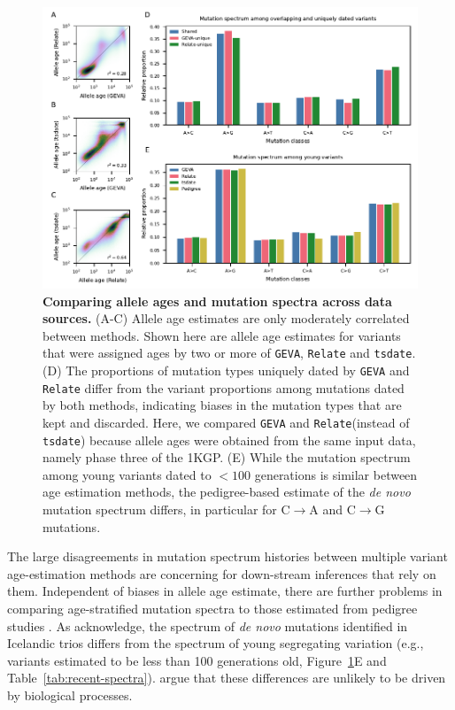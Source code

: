 \documentclass[]{article}
\newcommand{\krtcomment}[1]{{\textcolor{purple}{KRT: #1}}}
\newcommand{\GEVA}{\texttt{GEVA}\xspace}
\newcommand{\tsdate}{\texttt{tsdate}\xspace}
\newcommand{\relate}{\texttt{Relate}\xspace}
\begin{document}
\begin{figure}[t!]
    \centering
    \includegraphics{../plots/fig2.pdf}
    \caption{
        \textbf{Comparing allele ages and mutation spectra across data
        sources.} (A-C) Allele age estimates are only moderately correlated
        between methods. Shown here are allele age estimates for variants that
        were assigned ages by two or more of \GEVA, \relate and \tsdate. (D)
        The proportions of mutation types uniquely dated by \GEVA and \relate
        differ from the variant proportions among mutations dated by both
        methods, indicating biases in the mutation types that are kept and
        discarded. Here, we compared \GEVA and \relate (instead of \tsdate)
        because allele ages were obtained from the same input data, namely
        phase three of the 1KGP.
        (E) While the mutation spectrum among young variants dated
        to $<100$ generations is similar between age estimation methods,
        the pedigree-based estimate of the \emph{de novo} mutation spectrum
        \citep{jonsson2017parental} differs, in particular for C$\rightarrow$A
        and C$\rightarrow$G mutations.
    }
    \label{fig:data-comp}
\end{figure}

The large disagreements in mutation spectrum histories between multiple variant
age-estimation methods are concerning for down-stream inferences that rely on
them. Independent of biases in allele age estimate, there are further problems
in comparing age-stratified mutation spectra to those estimated from pedigree
studies \citep{jonsson2017parental,halldorsson2019characterizing}. As
\citet{wang2023human} acknowledge, the spectrum of \emph{de novo} mutations
identified in Icelandic trios \citep{jonsson2017parental} differs from the
spectrum of young segregating variation (e.g., variants estimated to be less
than 100 generations old, Figure~\ref{fig:data-comp}E and
Table~\ref{tab:recent-spectra}). \citet{gao2022limited} argue that these
differences are unlikely to be driven by biological processes.
\end{document}

